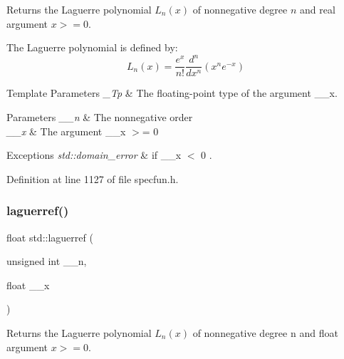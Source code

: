 Returns the Laguerre polynomial $ L_n(x) $ of nonnegative degree $ n $ and real argument $ x >= 0 $.

The Laguerre polynomial is defined by\+: \[ L_n(x) = \frac{e^x}{n!} \frac{d^n}{dx^n} (x^ne^{-x}) \]


\begin{DoxyTemplParams}{Template Parameters}
{\em \+\_\+\+Tp} & The floating-\/point type of the argument {\ttfamily \+\_\+\+\_\+x}. \\
\hline
\end{DoxyTemplParams}

\begin{DoxyParams}{Parameters}
{\em \+\_\+\+\_\+n} & The nonnegative order \\
\hline
{\em \+\_\+\+\_\+x} & The argument {\ttfamily  \+\_\+\+\_\+x $>$= 0 } \\
\hline
\end{DoxyParams}

\begin{DoxyExceptions}{Exceptions}
{\em std\+::domain\+\_\+error} & if {\ttfamily  \+\_\+\+\_\+x $<$ 0 }. \\
\hline
\end{DoxyExceptions}


Definition at line 1127 of file specfun.\+h.

\mbox{\label{group__tr29124__math__spec__func_gada763419b0e21b38e38daa8b6eb56a8c}} 
\subsubsection{\texorpdfstring{laguerref()}{laguerref()}}
{\footnotesize\ttfamily float std\+::laguerref (\begin{DoxyParamCaption}\item[{unsigned int}]{\+\_\+\+\_\+n,  }\item[{float}]{\+\_\+\+\_\+x }\end{DoxyParamCaption})\hspace{0.3cm}{\ttfamily [inline]}}

Returns the Laguerre polynomial $ L_n(x) $ of nonnegative degree {\ttfamily n} and {\ttfamily float} argument $ x >= 0 $.

